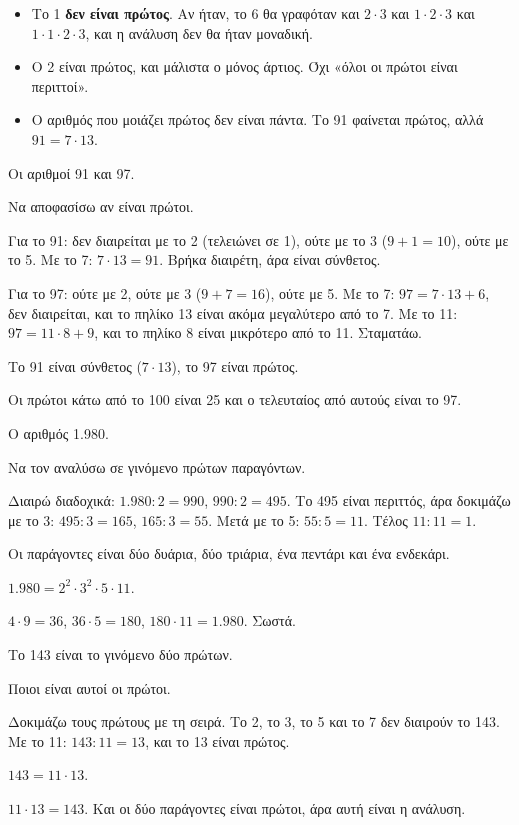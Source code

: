 \begin{prosoxi}
\begin{itemize}[leftmargin=1.2em,itemsep=0.3ex,topsep=2pt]
\item Το 1 \textbf{δεν είναι πρώτος}. Αν ήταν, το 6 θα γραφόταν και $2\cdot 3$ και $1\cdot 2\cdot 3$ και $1\cdot 1\cdot 2\cdot 3$, και η ανάλυση δεν θα ήταν μοναδική.
\item Ο 2 είναι πρώτος, και μάλιστα ο μόνος άρτιος. Όχι «όλοι οι πρώτοι είναι περιττοί».
\item Ο αριθμός που μοιάζει πρώτος δεν είναι πάντα. Το 91 φαίνεται πρώτος, αλλά $91=7\cdot 13$.
\end{itemize}
\end{prosoxi}


\tixero Οι αριθμοί 91 και 97.\par
\tithelo Να αποφασίσω αν είναι πρώτοι.\par
\possindeo Για το 91: δεν διαιρείται με το 2 (τελειώνει σε 1), ούτε με το 3 ($9+1=10$), ούτε με το 5. Με το 7: $7\cdot 13=91$. Βρήκα διαιρέτη, άρα είναι σύνθετος.\par
Για το 97: ούτε με 2, ούτε με 3 ($9+7=16$), ούτε με 5. Με το 7: $97=7\cdot 13+6$, δεν διαιρείται, και το πηλίκο 13 είναι ακόμα μεγαλύτερο από το 7. Με το 11: $97=11\cdot 8+9$, και το πηλίκο 8 είναι μικρότερο από το 11. Σταματάω.\par
\apantisi Το 91 είναι σύνθετος ($7\cdot 13$), το 97 είναι πρώτος.\par
\elegxos Οι πρώτοι κάτω από το 100 είναι 25 και ο τελευταίος από αυτούς είναι το 97.

\tixero Ο αριθμός 1.980.\par
\tithelo Να τον αναλύσω σε γινόμενο πρώτων παραγόντων.\par
\possindeo Διαιρώ διαδοχικά: $1.980:2=990$, $990:2=495$. Το 495 είναι περιττός, άρα δοκιμάζω με το 3: $495:3=165$, $165:3=55$. Μετά με το 5: $55:5=11$. Τέλος $11:11=1$.\par
Οι παράγοντες είναι δύο δυάρια, δύο τριάρια, ένα πεντάρι και ένα ενδεκάρι.\par
\apantisi $1.980=2^2\cdot 3^2\cdot 5\cdot 11$.\par
\elegxos $4\cdot 9=36$, $36\cdot 5=180$, $180\cdot 11=1.980$. Σωστά.

\tixero Το 143 είναι το γινόμενο δύο πρώτων.\par
\tithelo Ποιοι είναι αυτοί οι πρώτοι.\par
\possindeo Δοκιμάζω τους πρώτους με τη σειρά. Το 2, το 3, το 5 και το 7 δεν διαιρούν το 143. Με το 11: $143:11=13$, και το 13 είναι πρώτος.\par
\apantisi $143=11\cdot 13$.\par
\elegxos $11\cdot 13=143$. Και οι δύο παράγοντες είναι πρώτοι, άρα αυτή είναι η ανάλυση.

